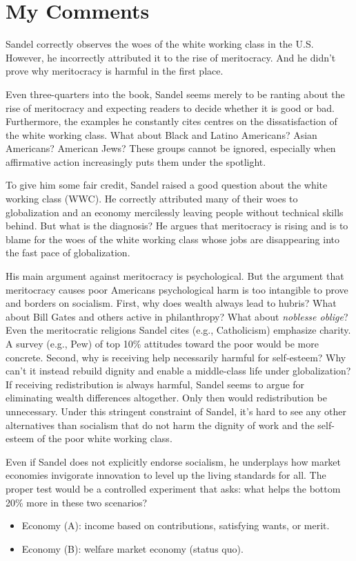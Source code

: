 \documentclass[12pt]{article}
\begin{document}
\section{My Comments}

Sandel correctly observes the woes of the white working class in the U.S. However, he incorrectly attributed it to the rise of meritocracy. And he didn't prove why meritocracy is harmful in the first place.

Even three-quarters into the book, Sandel seems merely to be ranting about the rise of meritocracy and expecting readers to decide whether it is good or bad. Furthermore, the examples he constantly cites centres on the dissatisfaction of the white working class. What about Black and Latino Americans? Asian Americans? American Jews? These groups cannot be ignored, especially when affirmative action increasingly puts them under the spotlight.

To give him some fair credit, Sandel raised a good question about the white working class (WWC). He correctly attributed many of their woes to globalization and an economy mercilessly leaving people without technical skills behind. But what is the diagnosis? He argues that meritocracy is rising and is to blame for the woes of the white working class whose jobs are disappearing into the fast pace of globalization.

His main argument against meritocracy is psychological. But the argument that meritocracy causes poor Americans psychological harm is too intangible to prove and borders on socialism. First, why does wealth always lead to hubris? What about Bill Gates and others active in philanthropy? What about \emph{noblesse oblige}? Even the meritocratic religions Sandel cites (e.g., Catholicism) emphasize charity. A survey (e.g., Pew) of top 10\% attitudes toward the poor would be more concrete. Second, why is receiving help necessarily harmful for self-esteem? Why can't it instead rebuild dignity and enable a middle-class life under globalization? If receiving redistribution is always harmful, Sandel seems to argue for eliminating wealth differences altogether. Only then would redistribution be unnecessary. Under this stringent constraint of Sandel, it's hard to see any other alternatives than socialism that do not harm the dignity of work and the self-esteem of the poor white working class. 

Even if Sandel does not explicitly endorse socialism, he underplays how market economies invigorate innovation to level up the living standards for all. The proper test would be a controlled experiment that asks: what helps the bottom 20\% more in these two scenarios?
\begin{itemize}
    \item Economy (A): income based on contributions, satisfying wants, or merit.
    \item Economy (B): welfare market economy (status quo).
\end{itemize}
\end{document}
